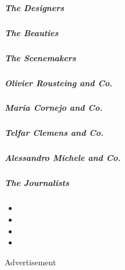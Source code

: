 \href{/interactive/2020/04/13/t-magazine/asian-american-fashion-designers.html}{}

\hypertarget{the-designers}{%
\subparagraph{The Designers}\label{the-designers}}

\href{13tmag-beauties.html}{}

\hypertarget{the-beauties}{%
\subparagraph{The Beauties}\label{the-beauties}}

\href{/interactive/2020/04/13/t-magazine/nyc-downtown-nightlife-party-scene.html}{}

\hypertarget{the-scenemakers}{%
\subparagraph{The Scenemakers}\label{the-scenemakers}}

\href{/interactive/2020/04/13/t-magazine/maria-cornejo-olivier-rousteing-telfar-clemens-alessandro-michele.html\#olivier-rousteing-and-co}{}

\hypertarget{olivier-rousteing-and-co}{%
\subparagraph{Olivier Rousteing and
Co.}\label{olivier-rousteing-and-co}}

\href{/interactive/2020/04/13/t-magazine/maria-cornejo-olivier-rousteing-telfar-clemens-alessandro-michele.html\#maria-cornejo-and-co}{}

\hypertarget{maria-cornejo-and-co}{%
\subparagraph{Maria Cornejo and Co.}\label{maria-cornejo-and-co}}

\href{/interactive/2020/04/13/t-magazine/maria-cornejo-olivier-rousteing-telfar-clemens-alessandro-michele.html\#telfar-clemens-and-co}{}

\hypertarget{telfar-clemens-and-co}{%
\subparagraph{Telfar Clemens and Co.}\label{telfar-clemens-and-co}}

\href{/interactive/2020/04/13/t-magazine/maria-cornejo-olivier-rousteing-telfar-clemens-alessandro-michele.html\#alessandro-michele-and-co}{}

\hypertarget{alessandro-michele-and-co}{%
\subparagraph{Alessandro Michele and
Co.}\label{alessandro-michele-and-co}}

\href{/interactive/2020/04/13/t-magazine/foreign-correspondents.html}{}

\hypertarget{the-journalists}{%
\subparagraph{The Journalists}\label{the-journalists}}

\begin{itemize}
\item
\item
\item
\item
\end{itemize}

Advertisement

